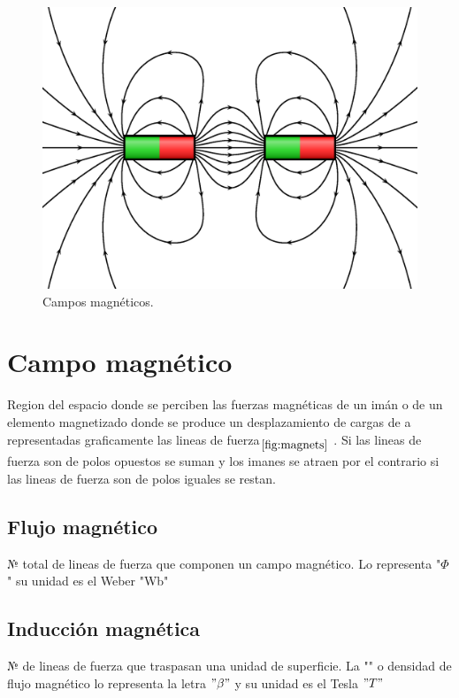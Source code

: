 \documentclass{report}
\begin{document}
\begin{figure}[h]
  \centering
  \caption{Campos magnéticos.}
  \label{fig:magnets}
  \medskip
  \includegraphics[scale=0.5]{magnets.eps}
\end{figure}

\newpage
  \section{Campo magnético }\label{sec:campo_magnético}
Region del espacio donde se perciben las fuerzas magnéticas de un imán o de un elemento magnetizado  
donde se produce un desplazamiento de cargas de  a  representadas graficamente 
las lineas de fuerza\(_{\ref{fig:magnets}}\)
.  Si las lineas de fuerza son de polos opuestos se suman y los imanes se atraen por el 
contrario si las lineas de fuerza son de polos iguales se restan.

  \subsection{Flujo magnético }\label{ssec:Flujo}
№ total de lineas de fuerza que componen un campo magnético. Lo representa "\(\Phi\)" su unidad es el Weber "Wb"

  \subsection{Inducción magnética}\label{ssec:Inducción}
№ de lineas de fuerza que traspasan una unidad de superficie. La {""} o densidad de flujo magnético 
lo representa la letra \("\beta"\) y su unidad es el Tesla \("T"\)
\end{document}
